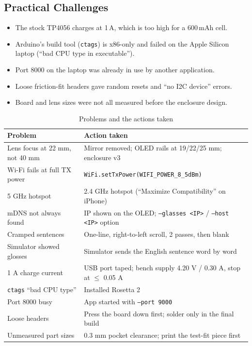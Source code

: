 \documentclass[12pt,a4paper]{report}
\begin{document}
\subsection{Practical Challenges}
\begin{itemize}
  \item The stock TP4056 charges at 1\,A, which is too high for a 600\,mAh cell.
  \item Arduino's build tool (\texttt{ctags}) is x86-only and failed on the Apple Silicon laptop (``bad CPU type in executable'').
  \item Port 8000 on the laptop was already in use by another application.
  \item Loose friction-fit headers gave random resets and ``no I2C device'' errors.
  \item Board and lens sizes were not all measured before the enclosure design.
\end{itemize}

\begin{table}[H]
\centering
\caption{Problems and the actions taken}
\label{tab:solutions}
\begin{tabularx}{\linewidth}{L{5cm} X}
\toprule
\textbf{Problem} & \textbf{Action taken} \\
\midrule
Lens focus at 22 mm, not 40 mm & Mirror removed; OLED rails at 19/22/25 mm; enclosure v3 \\
Wi-Fi fails at full TX power & \texttt{WiFi.setTxPower(WIFI\_POWER\_8\_5dBm)} \\
5 GHz hotspot & 2.4 GHz hotspot (``Maximize Compatibility'' on iPhone) \\
mDNS not always found & IP shown on the OLED; \texttt{--glasses <IP>} / \texttt{--host <IP>} option \\
Cramped sentences & One-line, right-to-left scroll, 2 passes, then blank \\
Simulator showed glosses & Simulator sends the English sentence word by word \\
1 A charge current & USB port taped; bench supply 4.20 V / 0.30 A, stop at $\le$ 0.05 A \\
\texttt{ctags} ``bad CPU type'' & Installed Rosetta 2 \\
Port 8000 busy & App started with \texttt{--port 9000} \\
Loose headers & Press the board down first; solder only in the final build \\
Unmeasured part sizes & 0.3 mm pocket clearance; print the test-fit piece first \\
\bottomrule
\end{tabularx}
\end{table}
\end{document}
